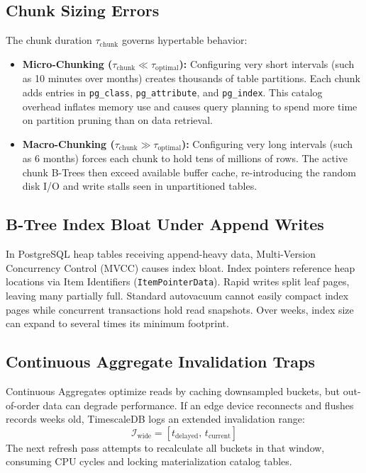 \documentclass[conference,a4paper]{IEEEtran}
\newcommand{\code}[1]{\texttt{\small #1}}
\begin{document}
\subsection{Chunk Sizing Errors}
The chunk duration $\tau_{\mathrm{chunk}}$ governs hypertable behavior:
\begin{itemize}
    \item \textbf{Micro-Chunking ($\tau_{\mathrm{chunk}} \ll \tau_{\mathrm{optimal}}$):}
    Configuring very short intervals (such as 10 minutes over months) creates thousands of table partitions. Each chunk adds entries in \code{pg\_class}, \code{pg\_attribute}, and \code{pg\_index}. This catalog overhead inflates memory use and causes query planning to spend more time on partition pruning than on data retrieval.
    \item \textbf{Macro-Chunking ($\tau_{\mathrm{chunk}} \gg \tau_{\mathrm{optimal}}$):}
    Configuring very long intervals (such as 6 months) forces each chunk to hold tens of millions of rows. The active chunk B-Trees then exceed available buffer cache, re-introducing the random disk I/O and write stalls seen in unpartitioned tables.
\end{itemize}

\subsection{B-Tree Index Bloat Under Append Writes}
In PostgreSQL heap tables receiving append-heavy data, Multi-Version Concurrency Control (MVCC) causes index bloat. Index pointers reference heap locations via Item Identifiers (\code{ItemPointerData}). Rapid writes split leaf pages, leaving many partially full. Standard autovacuum cannot easily compact index pages while concurrent transactions hold read snapshots. Over weeks, index size can expand to several times its minimum footprint.

\subsection{Continuous Aggregate Invalidation Traps}
Continuous Aggregates optimize reads by caching downsampled buckets, but out-of-order data can degrade performance. If an edge device reconnects and flushes records weeks old, TimescaleDB logs an extended invalidation range:
\begin{equation}
    \mathcal{I}_{\mathrm{wide}} = [t_{\mathrm{delayed}},\, t_{\mathrm{current}}]
\end{equation}
The next refresh pass attempts to recalculate all buckets in that window, consuming CPU cycles and locking materialization catalog tables.
\end{document}
